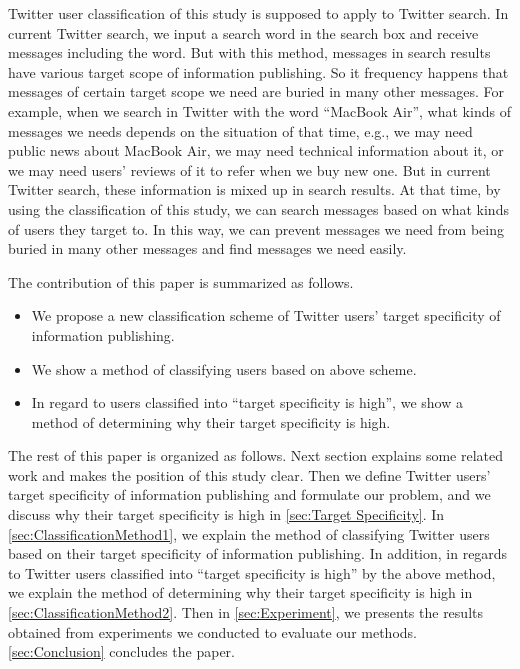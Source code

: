 Twitter user classification of this study is supposed to apply to
Twitter search.  In current Twitter search, we input a search word in the
search box and receive messages including the word.  But with this
method, messages in search results have various target scope of
information publishing.  So it frequency happens that messages of
certain target scope we need are buried in many other messages. For
example, when we search in Twitter with the word ``MacBook
Air'', what kinds of messages we needs depends on the situation of
that time, e.g., we may need public news about MacBook Air, we
may need technical information about it, or we may need
users' reviews of it to refer when we buy new one.  But in
current Twitter search, these information is mixed up in search results.
At that time, by using the classification of this study, we can
search messages based on what kinds of users they target to.  In this
way, we can prevent messages we need from being buried in many other
messages and find messages we need easily.

The contribution of this paper is summarized as follows.

\begin{itemize}
\item We propose a new classification scheme of Twitter users' target
      specificity of information publishing.
\item We show a method of classifying users based on above scheme.
\item In regard to users classified into ``target specificity is high'',
      we show a method of determining why their target specificity is
      high.
\end{itemize}

The rest of this paper is organized as follows.  Next section explains
some related work and makes the position of this study clear.  Then we
define Twitter users' target specificity of information publishing and
formulate our problem, and we discuss why their target specificity is
high in \ref{sec:Target Specificity}.  In
\ref{sec:ClassificationMethod1}, we explain the method of classifying
Twitter users based on their target specificity of information
publishing.  In addition, in regards to Twitter users
classified into  ``target specificity is high'' by the above method,
we explain the method of determining why their target specificity is
high in \ref{sec:ClassificationMethod2}.  Then in \ref{sec:Experiment},
we presents the results obtained from experiments we conducted to
evaluate our methods.  \ref{sec:Conclusion} concludes the paper.

